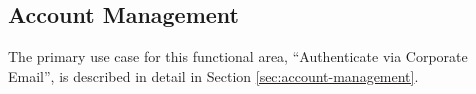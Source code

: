 \subsection{Account Management}

The primary use case for this functional area, ``Authenticate via Corporate Email'', is described in detail in Section \ref{sec:account-management}.
